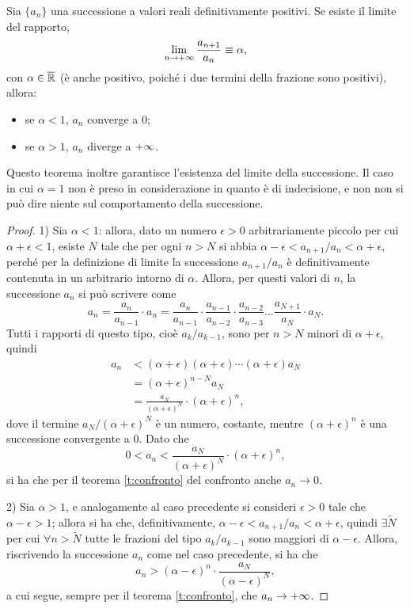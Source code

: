 \begin{teorema}
\label{t:criterio_del_rapporto_successioni}
Sia $\{a_n\}$ una successione a valori reali definitivamente positivi. Se esiste il limite del rapporto,
\[
\lim_{n\to +\infty} \frac{a_{n+1}}{a_n}\equiv\alpha,
\]
con $\alpha\in\overline{\mathbb{R}}$ (è anche positivo, poiché i due termini della frazione sono positivi), allora:
\begin{itemize}
	\item se $\alpha<1$, $a_n$ converge a 0;
	\item se $\alpha>1$, $a_n$ diverge a $+\infty$.
\end{itemize}
\end{teorema}
Questo teorema inoltre garantisce l'esistenza del limite della successione. Il caso in cui $\alpha=1$ non è preso in considerazione in quanto è di indecisione, e non non si può dire niente sul comportamento della successione.
\begin{proof}
1) Sia $\alpha<1$: allora, dato un numero $\epsilon>0$ arbitrariamente piccolo per cui $\alpha+\epsilon<1$, esiste $N$ tale che per ogni $n>N$ si abbia $\alpha-\epsilon<a_{n+1}/a_n<\alpha+\epsilon$, perché per la definizione di limite la successione $a_{n+1}/a_n$ è definitivamente contenuta in un arbitrario intorno di $\alpha$. Allora, per questi valori di $n$, la successione $a_n$ si può scrivere come
\[
a_n=\frac{a_n}{a_{n-1}}\cdot a_n=\frac{a_n}{a_{n-1}}\cdot\frac{a_{n-1}}{a_{n-2}}\cdot\frac{a_{n-2}}{a_{n-3}}\dots \frac{a_{N+1}}{a_N}\cdot a_N.
\]
Tutti i rapporti di questo tipo, cioè $a_k/a_{k-1}$, sono per $n>N$ minori di $\alpha+\epsilon$, quindi
\[
\begin{split}
	a_n&<(\alpha+\epsilon)(\alpha+\epsilon)\cdots(\alpha+\epsilon)a_N\\
	&=(\alpha+\epsilon)^{n-N}a_N\\
	&=\frac{a_N}{(\alpha+\epsilon)^N}\cdot (\alpha+\epsilon)^n,
\end{split}
\]
dove il termine $a_N/(\alpha+\epsilon)^N$ è un numero, costante, mentre $(\alpha+\epsilon)^n$ è una successione convergente a 0. Dato che
\[
0<a_n<\frac{a_N}{(\alpha+\epsilon)^N}\cdot (\alpha+\epsilon)^n,
\]
si ha che per il teorema \ref{t:confronto} del confronto anche $a_n\to 0$.

2) Sia $\alpha>1$, e analogamente al caso precedente si consideri $\epsilon>0$ tale che $\alpha-\epsilon>1$; allora si ha che, definitivamente, $\alpha-\epsilon<a_{n+1}/a_n<\alpha+\epsilon$, quindi $\exists\tilde{N}$ per cui $\forall n>\tilde{N}$ tutte le frazioni del tipo $a_k/a_{k-1}$ sono maggiori di $\alpha-\epsilon$. Allora, riscrivendo la successione $a_n$ come nel caso precedente, si ha che
\[
a_n>(\alpha-\epsilon)^n\cdot\frac{a_N}{(\alpha-\epsilon)^N},
\]
a cui segue, sempre per il teorema \ref{t:confronto}, che $a_n\to +\infty$.
\end{proof}
